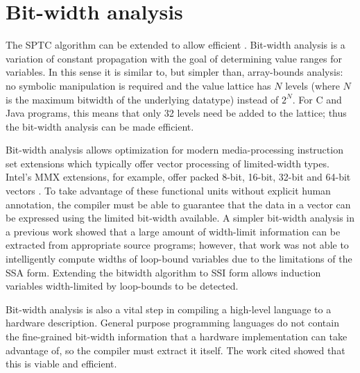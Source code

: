 
\section{Bit-width analysis}\label{sec:bitwidth}
The SPTC algorithm can be extended to allow efficient
.  Bit-width analysis is a variation of
constant propagation with the goal of determining value ranges for
variables.  In this sense it is similar to, but simpler than,
array-bounds analysis: no symbolic manipulation is required and the
value lattice has $N$ levels (where $N$ is the maximum bitwidth of the
underlying datatype) instead of $2^N$.  For C and Java programs, this
means that only 32 levels need be added to the lattice; thus the
bit-width analysis can be made efficient.

Bit-width analysis allows optimization for modern media-processing
instruction set extensions which typically offer vector processing of
limited-width types. Intel's MMX extensions, for example, offer packed
8-bit, 16-bit, 32-bit and 64-bit vectors \cite{peleg97:mmx}.
To take advantage of these functional units without explicit human
annotation, the compiler must be able to guarantee that the data in a
vector can be expressed using the limited bit-width available.  A
simpler bit-width analysis in a previous work \cite{ananian:siliconc}
showed that a large amount of width-limit information can be extracted
from appropriate source programs; however, that work was not able to
intelligently compute widths of loop-bound variables due to the
limitations of the SSA form.  Extending the bitwidth algorithm to SSI
form allows induction variables width-limited by loop-bounds to be
detected.

Bit-width analysis is also a vital step in compiling a high-level
language to a hardware description.  General purpose programming
languages do not contain the fine-grained bit-width information that a
hardware implementation can take advantage of, so the compiler must
extract it itself.  The work cited showed that this is viable
and efficient.

